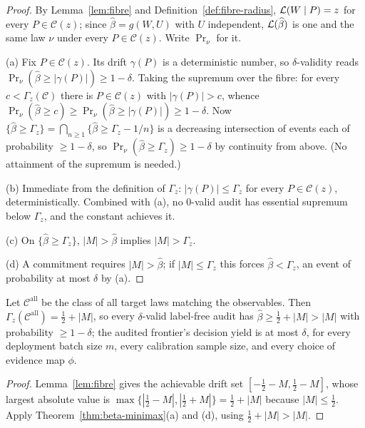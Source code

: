 \begin{proof}
By Lemma~\ref{lem:fibre} and Definition~\ref{def:fibre-radius}, $\mathcal{L}(W\mid P)=z$ for every
$P\in\mathcal C(z)$; since $\widehat\beta=g(W,U)$ with $U$ independent, $\mathcal{L}(\widehat\beta)$
is one and the same law $\nu$ under every $P\in\mathcal C(z)$. Write $\Pr_\nu$ for it.

(a) Fix $P\in\mathcal C(z)$. Its drift $\gamma(P)$ is a deterministic number, so
$\delta$-validity reads $\Pr_\nu(\widehat\beta\ge|\gamma(P)|)\ge1-\delta$. Taking the
supremum over the fibre: for every $c<\Gamma_z(\mathcal C)$ there is $P\in\mathcal C(z)$ with
$|\gamma(P)|>c$, whence $\Pr_\nu(\widehat\beta\ge c)\ge\Pr_\nu(\widehat\beta\ge|\gamma(P)|)\ge1-\delta$.
Now $\{\widehat\beta\ge\Gamma_z\}=\bigcap_{n\ge1}\{\widehat\beta\ge\Gamma_z-1/n\}$ is a
decreasing intersection of events each of probability $\ge1-\delta$, so
$\Pr_\nu(\widehat\beta\ge\Gamma_z)\ge1-\delta$ by continuity from above. (No attainment of the
supremum is needed.)

(b) Immediate from the definition of $\Gamma_z$: $|\gamma(P)|\le\Gamma_z$ for every
$P\in\mathcal C(z)$, deterministically. Combined with (a), no $0$-valid audit has essential
supremum below $\Gamma_z$, and the constant achieves it.

(c) On $\{\widehat\beta\ge\Gamma_z\}$, $|M|>\widehat\beta$ implies $|M|>\Gamma_z$.

(d) A commitment requires $|M|>\widehat\beta$; if $|M|\le\Gamma_z$ this forces
$\widehat\beta<\Gamma_z$, an event of probability at most $\delta$ by (a).
\end{proof}

\begin{corollary}\label{cor:audA}
Let $\mathcal C^{\mathrm{all}}$ be the class of all target laws matching the observables.
Then $\Gamma_z(\mathcal C^{\mathrm{all}})=\tfrac12+|M|$, so every $\delta$-valid label-free
audit has $\widehat\beta\ge\tfrac12+|M|>|M|$ with probability $\ge1-\delta$; the audited
frontier's decision yield is at most $\delta$, for every deployment batch size $m$, every
calibration sample size, and every choice of evidence map $\phi$.
\end{corollary}
\begin{proof}
Lemma~\ref{lem:fibre} gives the achievable drift set
$[-\tfrac12-M,\tfrac12-M]$, whose largest absolute value is
$\max\{|\tfrac12-M|,|\tfrac12+M|\}=\tfrac12+|M|$ because $|M|\le\tfrac12$. Apply
Theorem~\ref{thm:beta-minimax}(a) and (d), using $\tfrac12+|M|>|M|$.
\end{proof}


